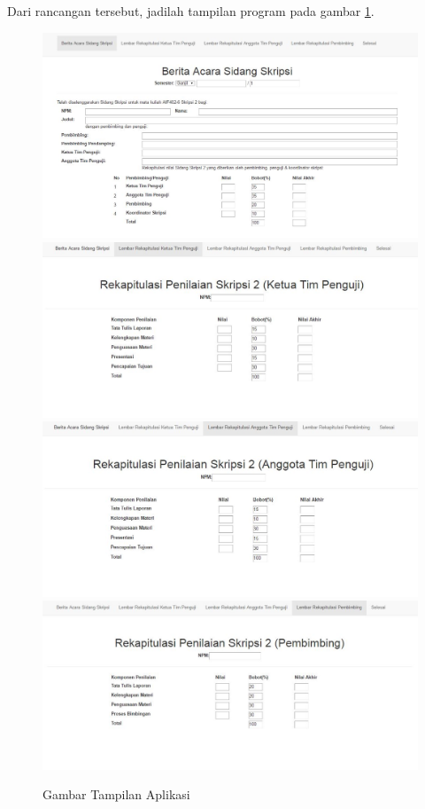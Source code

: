 \documentclass[a4paper,twoside]{article}
\begin{document}
\begin{enumerate}
		Dari rancangan tersebut, jadilah tampilan program pada gambar \ref{fig:tampilanapp}.\\
		
			\begin{figure}[H]
				\centering
				\includegraphics[scale=0.5]{Gambar/tampilanapp1}
				\includegraphics[scale=0.5]{Gambar/tampilanapp2}
				\includegraphics[scale=0.5]{Gambar/tampilanapp3}
				\includegraphics[scale=0.5]{Gambar/tampilanapp4}
				\caption{Gambar Tampilan Aplikasi}
				\label{fig:tampilanapp}
			\end{figure}


\end{enumerate}
\end{document}
